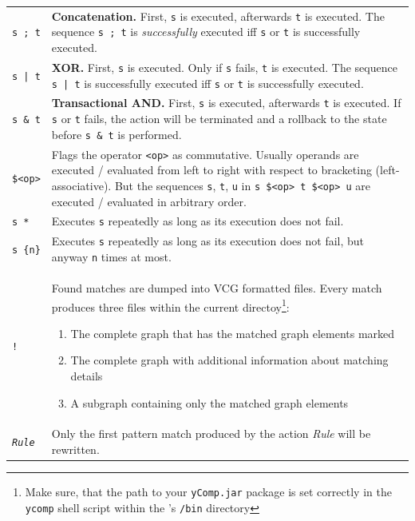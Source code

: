 \begin{table}[htbp]
\begin{minipage}{\linewidth} \renewcommand{\footnoterule}{} 
\begin{tabularx}{\linewidth}{|lX|}
\hline
\texttt{s ; t}		& \textbf{Concatenation.} First, \texttt{s} is executed, afterwards \texttt{t} is executed. The sequence \texttt{s ; t} is \emph{successfully} executed iff \texttt{s} or \texttt{t} is successfully executed.\\
\texttt{s | t}		& \textbf{XOR.} First, \texttt{s} is executed. Only if \texttt{s} fails, \texttt{t} is executed. The sequence \texttt{s | t} is successfully executed iff \texttt{s} or \texttt{t} is successfully executed.\\
\texttt{s \& t}	& \textbf{Transactional AND.} First, \texttt{s} is executed, afterwards \texttt{t} is executed. If \texttt{s} or \texttt{t} fails, the action will be terminated and a rollback to the state before \texttt{s \& t} is performed.\\
\texttt{\$<op>}	& Flags the operator \texttt{<op>} as commutative. Usually operands are executed / evaluated from left to right with respect to bracketing (left-associative). But the sequences \texttt{s}, \texttt{t}, \texttt{u} in \texttt{s \$<op> t \$<op> u} are executed / evaluated in arbitrary order. \\
\texttt{s *}		& Executes \texttt{s} repeatedly as long as its execution does not fail.\\
\texttt{s \{n\}}	& Executes \texttt{s} repeatedly as long as its execution does not fail, but anyway \texttt{n} times at most.\\
\texttt{!}		& Found matches are dumped into VCG formatted files. Every match produces three files within the current directoy\footnote{Make sure, that the path to your \texttt{yComp.jar} package is set correctly in the \texttt{ycomp} shell script within the \GrG's \texttt{/bin} directory}:
\begin{enumerate}
  \item The complete graph that has the matched graph elements marked
  \item The complete graph with additional information about matching details
  \item A subgraph containing only the matched graph elements
\end{enumerate}\\
\texttt{\emph{Rule}} & Only the first pattern match produced by the action \emph{Rule} will be rewritten.\\

\end{tabularx}
\end{minipage}
\end{table}
